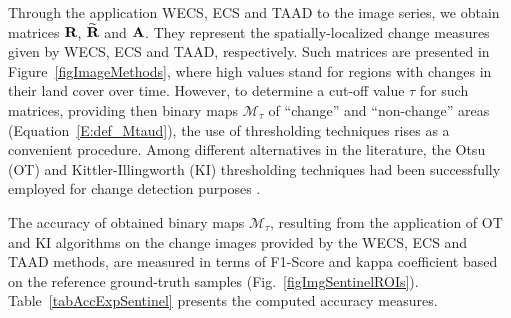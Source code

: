 \documentclass[journal]{IEEEtran}
\newcommand{\vA}{{\textbf A}}
\newcommand{\vR}{{\textbf R}}
\begin{document}
Through the application WECS, ECS and TAAD to the image series, we obtain matrices $\vR$, $\widetilde{\vR}$ and $\vA$. They represent the spatially-localized change measures given by WECS, ECS and TAAD, respectively. Such matrices are presented in Figure~\ref{figImageMethods}, where high values stand for regions with changes in their land cover over time.
%
However, to determine a cut-off value $\tau$ for such matrices, providing then binary maps $\mathcal{M}_{\tau}$ of ``change'' and ``non-change'' areas (Equation~\ref{E:def_Mtaud}), the use of thresholding techniques rises as a convenient procedure. 
Among different alternatives in the literature, the Otsu (OT) \cite{otsu1979threshold} and Kittler-Illingworth (KI) \cite{KittlerIllingworth1986} thresholding techniques had been successfully employed for change detection purposes \cite{JohnsonKasischke1998,Nielsen2007,WuEA2014,NegriEA2021}.


The accuracy of obtained binary maps $\mathcal{M}_{\tau}$, resulting from the application of OT and KI algorithms on the change images provided by the WECS, ECS and TAAD methods, are measured in terms of F1-Score and kappa coefficient based on the reference ground-truth samples (Fig.~\ref{figImgSentinelROIs}). 
Table~\ref{tabAccExpSentinel} presents the computed accuracy measures.
\end{document}
